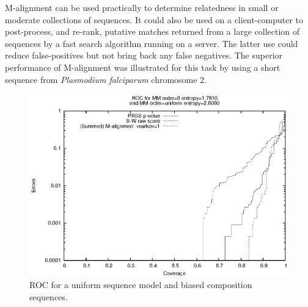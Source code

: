 \documentclass[letterpaper,11pt,oneside]{article}
\def\plotwidth{0.75\columnwidth}
\begin{document}
\begin{multicols}{2}
M-alignment can be used practically to determine relatedness
in small or moderate collections of sequences.
It could also be used on a client-computer to post-process, and re-rank,
putative matches returned from a large collection of sequences
by a fast search algorithm running on a server.
The latter use could reduce false-positives but not bring back
any false negatives.  The superior performance of M-alignment was illustrated
for this task by using a short sequence from \emph{Plasmodium
falciparum} chromosome 2.

\vspace{-4ex}      %



%




\end{multicols}



\newpage

\begin{figure}[ht!]
\centering
\includegraphics{roc_uni_0}
\caption{\label{fig:roc_uni_0}ROC for a uniform sequence model and biased composition sequences.}
\end{figure}
\end{document}
